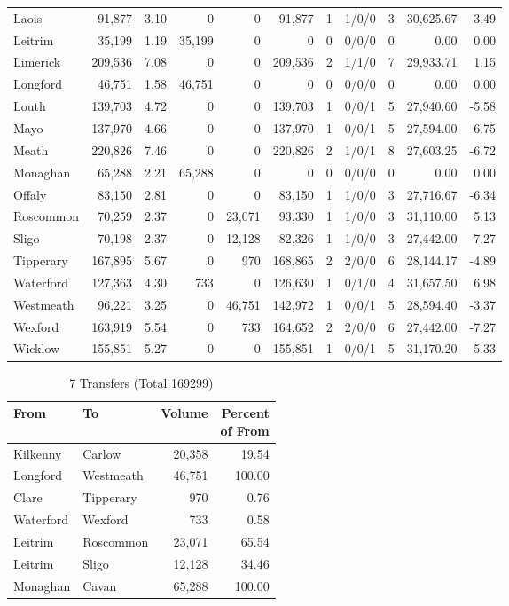 \documentclass[a4paper]{article}
\begin{document}
\begin{longtable}{lrrrrrrlrrr}
Laois&91,877& 3.10&0&0&91,877&1&1/0/0&3&30,625.67& 3.49\\ 
Leitrim&35,199& 1.19&35,199&0&0&0&0/0/0&0& 0.00& 0.00\\ 
Limerick&209,536& 7.08&0&0&209,536&2&1/1/0&7&29,933.71& 1.15\\ 
Longford&46,751& 1.58&46,751&0&0&0&0/0/0&0& 0.00& 0.00\\ 
Louth&139,703& 4.72&0&0&139,703&1&0/0/1&5&27,940.60&-5.58\\ 
Mayo&137,970& 4.66&0&0&137,970&1&0/0/1&5&27,594.00&-6.75\\ 
Meath&220,826& 7.46&0&0&220,826&2&1/0/1&8&27,603.25&-6.72\\ 
Monaghan&65,288& 2.21&65,288&0&0&0&0/0/0&0& 0.00& 0.00\\ 
Offaly&83,150& 2.81&0&0&83,150&1&1/0/0&3&27,716.67&-6.34\\ 
Roscommon&70,259& 2.37&0&23,071&93,330&1&1/0/0&3&31,110.00& 5.13\\ 
Sligo&70,198& 2.37&0&12,128&82,326&1&1/0/0&3&27,442.00&-7.27\\ 
Tipperary&167,895& 5.67&0&970&168,865&2&2/0/0&6&28,144.17&-4.89\\ 
Waterford&127,363& 4.30&733&0&126,630&1&0/1/0&4&31,657.50& 6.98\\ 
Westmeath&96,221& 3.25&0&46,751&142,972&1&0/0/1&5&28,594.40&-3.37\\ 
Wexford&163,919& 5.54&0&733&164,652&2&2/0/0&6&27,442.00&-7.27\\ 
Wicklow&155,851& 5.27&0&0&155,851&1&0/0/1&5&31,170.20& 5.33\\ 
\end{longtable}

\begin{table}[htbp]
\caption{7 Transfers (Total 169299)}
\centering
\begin{tabular}{llrr} \toprule
From &To &Volume &\shortstack{Percent\\of From} \\ \midrule
Kilkenny&Carlow&20,358&19.54\\ 
Longford&Westmeath&46,751&100.00\\ 
Clare&Tipperary&970& 0.76\\ 
Waterford&Wexford&733& 0.58\\ 
Leitrim&Roscommon&23,071&65.54\\ 
Leitrim&Sligo&12,128&34.46\\ 
Monaghan&Cavan&65,288&100.00\\ 
\bottomrule
\end{tabular}
\end{table}
\end{document}
